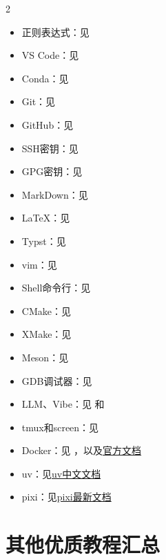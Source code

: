 \begin{multicols}{2}
    \begin{itemize}
    \item 正则表达式：见
    \item VS Code：见
    \item Conda：见
    \item Git：见
    \item GitHub：见
    \item SSH密钥：见
    \item GPG密钥：见
    \item MarkDown：见
    \item \LaTeX：见
    \item Typst：见
    \item vim：见
    \item Shell命令行：见
    \item CMake：见
    \item XMake：见
    \item Meson：见
    \item GDB调试器：见
    \item LLM、Vibe：见  和
    \item tmux和screen：见
    \item Docker：见  ，以及\href{https://docs.docker.com/get-started/}{官方文档}
    \item uv：见\href{https://uv.doczh.com/}{uv中文文档}
    \item pixi：见\href{https://pixi.sh/latest/}{pixi最新文档}
\end{itemize}
\end{multicols}

\newpage

\section*{其他优质教程汇总}


